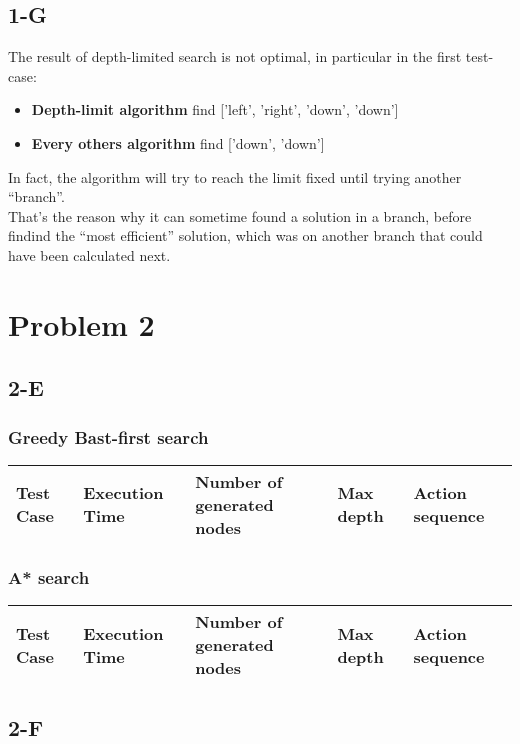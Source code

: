 \documentclass{article}
\begin{document}
        \subsection{1-G}
            The result of depth-limited search is not optimal, in particular in the first test-case:
            \begin{itemize}
                \item \textbf{Depth-limit algorithm} find ['left', 'right', 'down', 'down']
                \item \textbf{Every others algorithm} find ['down', 'down']
            \end{itemize}
            In fact, the algorithm will try to reach the limit fixed until trying another ``branch''.\\
            That's the reason why it can sometime found a solution in a branch, before findind the ``most efficient'' solution, which was on another branch that could have been calculated next.
    \section{Problem 2}
        \subsection{2-E}
            \subsubsection{Greedy Bast-first search}
                \begin{tabular}{|L|L|L|L|L|}\hline
                    Test Case & Execution Time & Number of generated nodes & Max depth & Action sequence\\\hline
                \end{tabular}
            \subsubsection{A* search}
                \begin{tabular}{|L|L|L|L|L|}\hline
                    Test Case & Execution Time & Number of generated nodes & Max depth & Action sequence\\\hline
                \end{tabular}
        \subsection{2-F}
\end{document}
